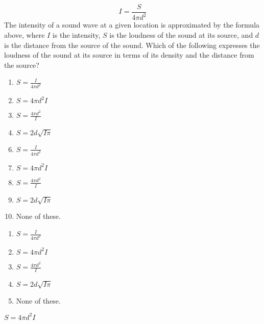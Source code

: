 
$$ I=\frac{S}{4\pi d^2}$$
The intensity of a sound wave at a given location is approximated by the formula above, where $I$ is the intensity, $S$ is the loudness of the sound at its source, and $d$ is the distance from the source of the sound.  Which of the following expresses the loudness of the sound at its source in terms of its density and the distance from the source?


\ifsat
	\begin{enumerate}[label=\Alph*)]
		\item $S=\frac{I}{4\pi d^2} $ 
		\item $S=4\pi d^2 I $ %
		\item $S=\frac{4\pi d^2}{I} $ 
		\item $S=2d\sqrt{I\pi} $
	\end{enumerate}
\else
\fi

\ifacteven
	\begin{enumerate}[label=\textbf{\Alph*.},itemsep=\fill,align=left]
		\setcounter{enumii}{5}
		\item $S=\frac{I}{4\pi d^2} $ 
		\item $S=4\pi d^2 I $ %
		\item $S=\frac{4\pi d^2}{I} $ 
		\addtocounter{enumii}{1}
		\item $S=2d\sqrt{I\pi} $
		\item None of these. 
	\end{enumerate}
\else
\fi

\ifactodd
	\begin{enumerate}[label=\textbf{\Alph*.},itemsep=\fill,align=left]
		\item $S=\frac{I}{4\pi d^2} $ 
		\item $S=4\pi d^2 I $ %
		\item $S=\frac{4\pi d^2}{I} $ 
		\item $S=2d\sqrt{I\pi} $
		\item None of these. 
	\end{enumerate}
\else
\fi

\ifgridin
 $S=4\pi d^2 I $ %
		
\else
\fi

